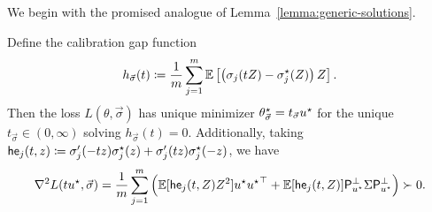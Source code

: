 We begin with the promised analogue of
Lemma~\ref{lemma:generic-solutions}.
\begin{lemma}
  \label{lemma:super-generic-solutions}
  Define the calibration gap function
  \begin{equation}
    \label{eqn:general-h-m-func}
    h_{\vec{\sigma}}(t)
    \coloneqq \frac{1}{m} \sum_{j = 1}^m
    \mathbb{E}\left[\left(\sigma_j(tZ) - \sigma_j^\star(Z)\right) Z\right].
  \end{equation}
  Then the loss $L(\theta, \vec{\sigma})$ has unique
  minimizer $\theta^\star_{\vec{\sigma}} = t_{\vec{\sigma}} u^\star$ for the
  unique $t_{\vec{\sigma}} \in (0, \infty)$ solving
  $h_{\vec{\sigma}}(t) = 0$. Additionally,
  taking
  $\mathsf{he}_j(t, z) \coloneqq
  \sigma_j'(-tz) \sigma_j^\star(z) + \sigma_j'(tz) \sigma_j^\star(-z)$,
  we have
  \begin{equation*}
    \nabla^2 L(t u^\star, \vec{\sigma})
    = \frac{1}{m} \sum_{j = 1}^m \left(
    \mathbb{E}[\mathsf{he}_j(t, Z) Z^2] u^\star {u^\star}^\top
    + \mathbb{E}[\mathsf{he}_j(t, Z)] \mathsf{P}_{u^\star}^\perp \Sigma \mathsf{P}_{u^\star}^\perp \right)
    \succ 0.
  \end{equation*}
\end{lemma}
